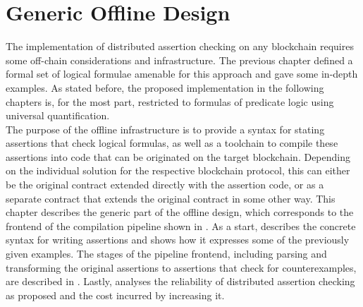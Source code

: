 

\chapter{Generic Offline Design}\label{chap:offline}
The implementation of distributed assertion checking on any blockchain requires some off-chain considerations and infrastructure. The previous chapter defined a formal set of logical formulae amenable for this approach and gave some in-depth examples. As stated before, the proposed implementation in the following chapters is, for the most part, restricted to formulas of predicate logic using universal quantification.\\
The purpose of the offline infrastructure is to provide a syntax for stating assertions that check logical formulas, as well as a toolchain to compile these assertions into code that can be originated on the target blockchain. Depending on the individual solution for the respective blockchain protocol, this can either be the original contract extended directly with the assertion code, or as a separate contract that extends the original contract in some other way. This chapter describes the generic part of the offline design, which corresponds to the frontend of the compilation pipeline shown in . As a start,  describes the concrete syntax for writing assertions and shows how it expresses some of the previously given examples. The stages of the pipeline frontend, including parsing and transforming the original assertions to assertions that check for counterexamples, are described in . Lastly,  analyses the reliability of distributed assertion checking as proposed and the cost incurred by increasing it.


